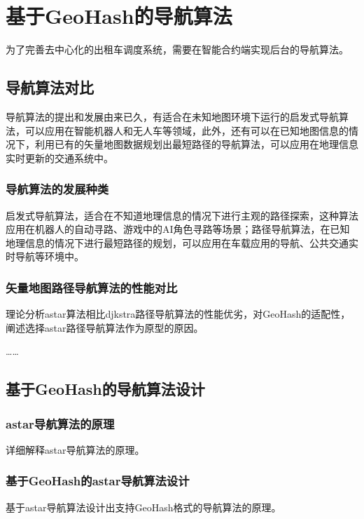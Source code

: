 \chapter{基于GeoHash的导航算法}
为了完善去中心化的出租车调度系统，需要在智能合约端实现后台的导航算法。
\section{导航算法对比}
导航算法的提出和发展由来已久，有适合在未知地图环境下运行的启发式导航算法，可以应用在智能机器人和无人车等领域，此外，还有可以在已知地图信息的情况下，利用已有的矢量地图数据规划出最短路径的导航算法，可以应用在地理信息实时更新的交通系统中。
\subsection{导航算法的发展种类}
启发式导航算法，适合在不知道地理信息的情况下进行主观的路径探索，这种算法应用在机器人的自动寻路、游戏中的AI角色寻路等场景；路径导航算法，在已知地理信息的情况下进行最短路径的规划，可以应用在车载应用的导航、公共交通实时导航等环境中。
\subsection{矢量地图路径导航算法的性能对比}
理论分析astar算法相比djkstra路径导航算法的性能优劣，对GeoHash的适配性，阐述选择astar路径导航算法作为原型的原因。

……

\section{基于GeoHash的导航算法设计}
\subsection{astar导航算法的原理}
详细解释astar导航算法的原理。
\subsection{基于GeoHash的astar导航算法设计}
基于astar导航算法设计出支持GeoHash格式的导航算法的原理。